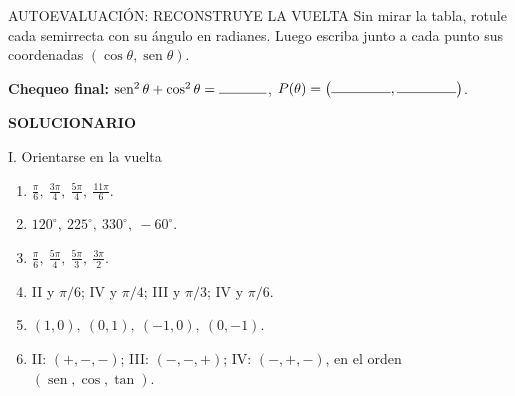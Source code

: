 \documentclass[letterpaper,12pt]{article}
\newcommand{\seno}{\operatorname{sen}}
\begin{document}
\begin{teoriabox}{AUTOEVALUACIÓN: RECONSTRUYE LA VUELTA}
\small
Sin mirar la tabla, rotule cada semirrecta con su ángulo en radianes. Luego escriba junto a cada punto sus coordenadas \((\cos\theta,\seno\theta)\).

\begin{center}
\end{center}

\textbf{Chequeo final:}\quad
\(\seno^2\theta+\cos^2\theta=\rule{1.2cm}{0.4pt}\),\qquad
\(P(\theta)=\bigl(\rule{1.5cm}{0.4pt},\rule{1.5cm}{0.4pt}\bigr)\).
\end{teoriabox}

\clearpage
\begin{center}
    \begin{tcolorbox}[
        colback=azulFuerte,
        colframe=azulFuerte,
        colupper=white,
        width=0.8\textwidth,
        center,
        arc=10pt]
        \centering\Large\textbf{SOLUCIONARIO}
    \end{tcolorbox}
\end{center}

\begin{solbox}{I. Orientarse en la vuelta}
\begin{enumerate}[label=\color{azulFuerte}\textbf{\arabic*.},leftmargin=*]
    \item \(\displaystyle \frac{\pi}{6},\ \frac{3\pi}{4},\ \frac{5\pi}{4},\ \frac{11\pi}{6}\).
    \item \(\displaystyle 120^\circ,\ 225^\circ,\ 330^\circ,\ -60^\circ\).
    \item \(\displaystyle \frac{\pi}{6},\ \frac{5\pi}{4},\ \frac{5\pi}{3},\ \frac{3\pi}{2}\).
    \item II y \(\pi/6\); IV y \(\pi/4\); III y \(\pi/3\); IV y \(\pi/6\).
    \item \((1,0),\ (0,1),\ (-1,0),\ (0,-1)\).
    \item II: \((+,-,-)\); III: \((-,-,+)\); IV: \((-,+,-)\), en el orden \((\seno,\cos,\tan)\).
\end{enumerate}
\end{solbox}
\end{document}

